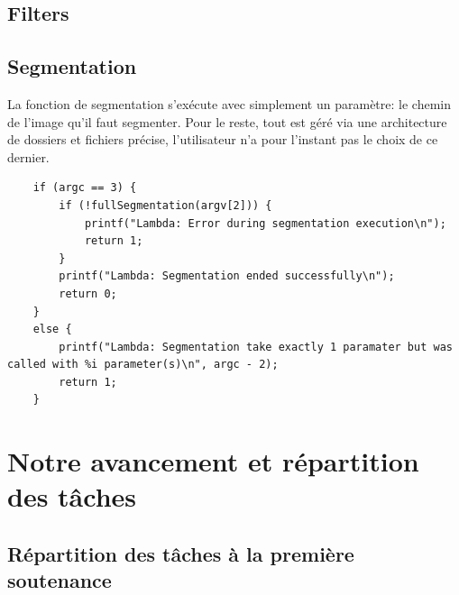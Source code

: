 \documentclass{article}
\begin{document}
\subsection{Filters}

\subsection{Segmentation}

La fonction de segmentation s'exécute avec simplement un paramètre: le chemin de l'image qu'il faut segmenter. Pour le reste, tout est géré via une architecture de dossiers et fichiers précise, l'utilisateur n'a pour l'instant pas le choix de ce dernier.

\begin{lstlisting}
	if (argc == 3) {
		if (!fullSegmentation(argv[2])) {
			printf("Lambda: Error during segmentation execution\n");
			return 1;
		}
		printf("Lambda: Segmentation ended successfully\n");
		return 0;
	}
	else {
		printf("Lambda: Segmentation take exactly 1 paramater but was called with %i parameter(s)\n", argc - 2);
		return 1;
	}
\end{lstlisting}

\newpage
{}
\section{Notre avancement et répartition des tâches}


\subsection{Répartition des tâches à la première soutenance}
\end{document}
